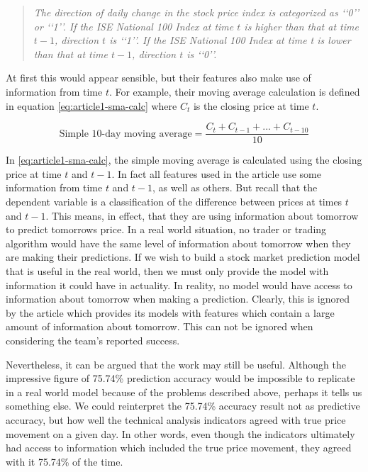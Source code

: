 \documentclass{report}
\begin{document}
\begin{quotation}
\textit{The direction of daily change in the stock price index is categorized
as ‘‘0’’ or ‘‘1’’. If the ISE National 100 Index at time $t$ is higher
than that at time $t-1$, direction $t$ is ‘‘1’’. If the ISE National 100
Index at time t is lower than that at time $t-1$, direction $t$ is ‘‘0’’.}
\end{quotation}

At first this would appear sensible, but their features also make use of information from time $t$. For example, their moving average calculation is defined in equation \ref{eq:article1-sma-calc} where $C_{t}$ is the closing price at time $t$.

  \begin{figure}[H]
  \begin{center}
      \begin{equation}
        \text{Simple 10-day moving average} = \dfrac
          {C_{t} + C_{t-1} + ... + C_{t-10}} {10}
        \label{eq:article1-sma-calc}
      \end{equation}
  \end{center}
  \end{figure} 

In \ref{eq:article1-sma-calc}, the simple moving average is calculated using the closing price at time $t$ and $t-1$. In fact all features used in the article use some information from time $t$ and $t-1$, as well as others. But recall that the dependent variable is a classification of the difference between prices at times $t$ and $t-1$. This means, in effect, that they are using information about tomorrow to predict tomorrows price. In a real world situation, no trader or trading algorithm would have the same level of information about tomorrow when they are making their predictions. If we wish to build a stock market prediction model that is useful in the real world, then we must only provide the model with information it could have in actuality. In reality, no model would have access to information about tomorrow when making a prediction. Clearly, this is ignored by the article which provides its models with features which contain a large amount of information about tomorrow. This can not be ignored when considering the team's reported success.

Nevertheless, it can be argued that the work may still be useful. Although the impressive figure of 75.74\% prediction accuracy would be impossible to replicate in a real world model because of the problems described above, perhaps it tells us something else. We could reinterpret the 75.74\% accuracy result not as predictive accuracy, but how well the technical analysis indicators agreed with true price movement on a given day. In other words, even though the indicators ultimately had access to information which included the true price movement, they agreed with it 75.74\% of the time. 
\end{document}
